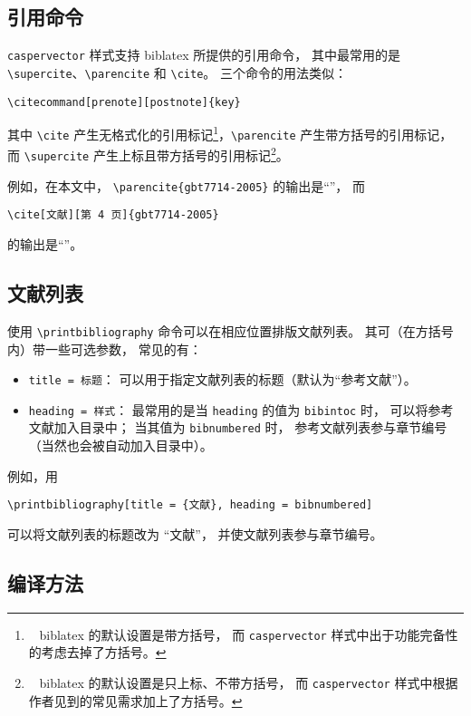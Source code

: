 \documentclass[UTF8, fancyhdr, hyperref]{ctexart}
\begin{document}
\subsection{引用命令}

\verb|caspervector| 样式支持 biblatex 所提供的引用命令，
其中最常用的是 \verb|\supercite|、\verb|\parencite| 和 \verb|\cite|。
三个命令的用法类似：
\begin{Verbatim}[frame = single]
% 可选参数 prenote 和 postnote 分别用于设定引用记号前、后的注释。
\citecommand[prenote][postnote]{key}
\end{Verbatim}
其中 \verb|\cite| 产生无格式化的引用标记\footnote{\ %
	biblatex 的默认设置是带方括号，
	而 \texttt{caspervector} 样式中出于功能完备性的考虑去掉了方括号。%
}，\verb|\parencite| 产生带方括号的引用标记，
而 \verb|\supercite| 产生上标且带方括号的引用标记\footnote{\ %
	biblatex 的默认设置是只上标、不带方括号，
	而 \texttt{caspervector} 样式中根据作者见到的常见需求加上了方括号。%
}。

例如，在本文中，%
\verb|\parencite{gbt7714-2005}| 的输出是“\parencite{gbt7714-2005}”，
而
\begin{Verbatim}[frame = single]
\cite[文献][第 4 页]{gbt7714-2005}
\end{Verbatim}
的输出是“\cite[文献][第 4 页]{gbt7714-2005}”。

\subsection{文献列表}

使用 \verb|\printbibliography| 命令可以在相应位置排版文献列表。
其可（在方括号内）带一些可选参数\supercite{biblatex}，
常见的有：
\begin{itemize}
	\item \verb|title = 标题|：
		可以用于指定文献列表的标题（默认为“参考文献”）。
	\item \verb|heading = 样式|：
		最常用的是当 \verb|heading| 的值为 \verb|bibintoc| 时，
		可以将参考文献加入目录中；
		当其值为 \verb|bibnumbered| 时，
		参考文献列表参与章节编号（当然也会被自动加入目录中）。
\end{itemize}

例如，用
\begin{Verbatim}[frame = single]
\printbibliography[title = {文献}, heading = bibnumbered]
\end{Verbatim}
可以将文献列表的标题改为 “文献”，
并使文献列表参与章节编号。

\subsection{编译方法}
\end{document}

